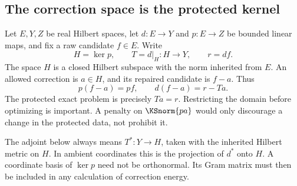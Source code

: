 \subsection{The correction space is the protected kernel}
Let $E,Y,Z$ be real Hilbert spaces, let $d:E\to Y$ and $p:E\to Z$ be bounded linear maps, and fix a raw candidate $f\in E$. Write
\[
 H=\ker p,\qquad T=d|_H:H\to Y,\qquad r=df.
\]
The space $H$ is a closed Hilbert subspace with the norm inherited from $E$. An allowed correction is $a\in H$, and its repaired candidate is $f-a$. Thus
\[
 p(f-a)=pf,\qquad d(f-a)=r-Ta.
\]
The protected exact problem is precisely $Ta=r$. Restricting the domain before optimizing is important. A penalty on $\KSnorm{pa}$ would only discourage a change in the protected data, not prohibit it.

The adjoint below always means $T^*:Y\to H$, taken with the inherited Hilbert metric on $H$. In ambient coordinates this is the projection of $d^*$ onto $H$. A coordinate basis of $\ker p$ need not be orthonormal. Its Gram matrix must then be included in any calculation of correction energy.

